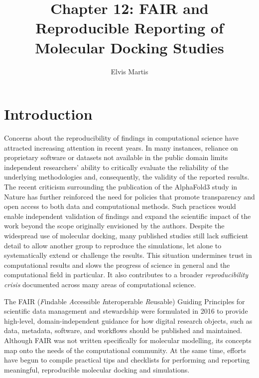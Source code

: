 \documentclass[12pt]{article}
\begin{document}
\title{Chapter 12: FAIR and Reproducible Reporting of Molecular Docking Studies}
\author{Elvis Martis}
\date{}
\maketitle


\section{Introduction}
Concerns about the reproducibility of findings in computational science have attracted increasing attention in recent years. In many instances, reliance on proprietary software or datasets not available in the public domain limits independent researchers' ability to critically evaluate the reliability of the underlying methodologies and, consequently, the validity of the reported results. The recent criticism surrounding the publication of the AlphaFold3\cite{CH12_AF3} study in Nature has further reinforced the need for policies that promote transparency and open access to both data and computational methods. Such practices would enable independent validation of findings and expand the scientific impact of the work beyond the scope originally envisioned by the authors\cite{ CH12_plos2025tenDocking}. Despite the widespread use of molecular docking, many published studies still lack sufficient detail to allow another group to reproduce the simulations, let alone to systematically extend or challenge the results. This situation undermines trust in computational results and slows the progress of science in general and the computational field in particular. It also contributes to a broader \emph{reproducibility crisis} documented across many areas of computational science\cite{CH12_toolsRepro2016,CH12_reproWorkflows2017,CH12_barba2022role,CH12_rigorRepro2020}.

The FAIR (\emph{F}indable \emph{A}ccessible \emph{I}nteroperable \emph{R}eusable) Guiding Principles for scientific data management and stewardship were formulated in 2016 to provide high-level, domain-independent guidance for how digital research objects, such as data, metadata, software, and workflows should be published and maintained\cite{CH12_wilkinson2016FAIR,CH12_goFairPrinciples,CH12_nnlmFAIR}. Although FAIR was not written specifically for molecular modelling, its concepts map onto the needs of the computational community\cite{CH12_turingWayFAIR,CH12_healthFAIR2022}. At the same time, efforts have begun to compile practical tips and checklists for performing and reporting meaningful, reproducible molecular docking and simulations\cite{CH12_plos2025tenDocking,CH12_mdChecklist2023,CH12_rigorRepro2020}.
\end{document}
